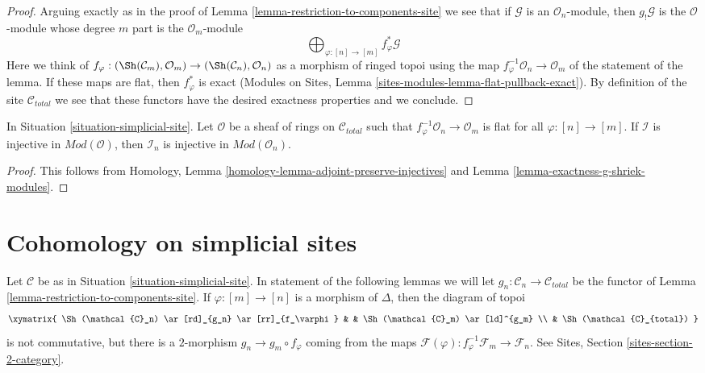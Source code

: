 \begin{proof}
Arguing exactly as in the proof of
Lemma \ref{lemma-restriction-to-components-site}
we see that if $\mathcal{G}$ is an $\mathcal{O}_n$-module,
then $g_!\mathcal{G}$ is the $\mathcal{O}$-module
whose degree $m$ part is the $\mathcal{O}_m$-module
$$
\bigoplus\nolimits_{\varphi : [n] \to [m]} f_\varphi^*\mathcal{G}
$$
Here we think of
$f_\varphi : (\Sh(\mathcal{C}_m), \mathcal{O}_m) \to
(\Sh(\mathcal{C}_n), \mathcal{O}_n)$ as a morphism of ringed topoi
using the map $f_\varphi^{-1}\mathcal{O}_n \to \mathcal{O}_m$ of the
statement of the lemma. If these maps are flat, then
$f_\varphi^*$ is exact
(Modules on Sites, Lemma \ref{sites-modules-lemma-flat-pullback-exact}).
By definition of the site $\mathcal{C}_{total}$ we see that these
functors have the desired exactness properties and we conclude.
\end{proof}

\begin{lemma}
\label{lemma-restriction-injective-to-component-site-module}
In Situation \ref{situation-simplicial-site}.
Let $\mathcal{O}$ be a sheaf of rings on $\mathcal{C}_{total}$
such that $f_\varphi^{-1}\mathcal{O}_n \to \mathcal{O}_m$
is flat for all $\varphi : [n] \to [m]$.
If $\mathcal{I}$ is injective in $\textit{Mod}(\mathcal{O})$, then
$\mathcal{I}_n$ is injective in $\textit{Mod}(\mathcal{O}_n)$.
\end{lemma}

\begin{proof}
This follows from
Homology, Lemma \ref{homology-lemma-adjoint-preserve-injectives}
and
Lemma \ref{lemma-exactness-g-shriek-modules}.
\end{proof}







\section{Cohomology on simplicial sites}
\label{section-cohomology-simplicial-sites}

\noindent
Let $\mathcal{C}$ be as in Situation \ref{situation-simplicial-site}.
In statement of the following lemmas we will let
$g_n : \mathcal{C}_n \to \mathcal{C}_{total}$ be the functor of
Lemma \ref{lemma-restriction-to-components-site}. If $\varphi : [m] \to [n]$
is a morphism of $\Delta$, then the diagram of topoi
$$
\xymatrix{
\Sh(\mathcal{C}_n) \ar[rd]_{g_n} \ar[rr]_{f_\varphi} & &
\Sh(\mathcal{C}_m) \ar[ld]^{g_m} \\
& \Sh(\mathcal{C}_{total})
}
$$
is not commutative, but there is a $2$-morphism $g_n \to g_m \circ f_\varphi$
coming from the maps
$\mathcal{F}(\varphi) : f_\varphi^{-1}\mathcal{F}_m \to \mathcal{F}_n$.
See Sites, Section \ref{sites-section-2-category}.

